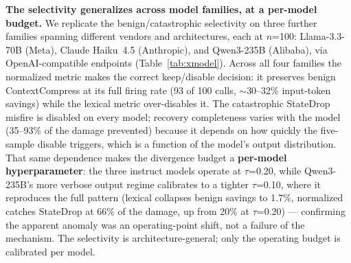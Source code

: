 \documentclass[sigconf,9pt]{acmart}
\begin{document}
\textbf{The selectivity generalizes across model families, at a per-model budget.} We
replicate the benign/catastrophic selectivity on three further families spanning different
vendors and architectures, each at $n$=100: Llama-3.3-70B (Meta), Claude Haiku~4.5
(Anthropic), and Qwen3-235B (Alibaba), via OpenAI-compatible endpoints
(Table~\ref{tab:xmodel}). Across all four families the normalized metric makes the correct
keep/disable decision: it preserves benign ContextCompress at its full firing rate (93 of 100
calls, $\sim$30--32\% input-token savings) while the lexical metric over-disables it. The
catastrophic StateDrop misfire is disabled on every model; recovery completeness varies with
the model (35--93\% of the damage prevented) because it depends on how quickly the
five-sample disable triggers, which is a function of the model's output distribution. That
same dependence makes the divergence budget a \textbf{per-model hyperparameter}: the three
instruct models operate at $\tau$=0.20, while Qwen3-235B's more verbose output regime
calibrates to a tighter $\tau$=0.10, where it reproduces the full pattern (lexical collapses
benign savings to 1.7\%, normalized catches StateDrop at 66\% of the damage, up from 20\% at
$\tau$=0.20) --- confirming the apparent anomaly was an operating-point shift, not a failure
of the mechanism. The selectivity is architecture-general; only the operating budget is
calibrated per model.
\end{document}
